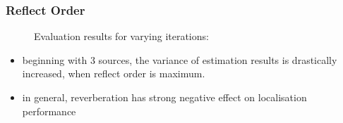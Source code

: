 \subsubsection{Reflect Order}
\begin{figure}[H]
	\begin{tikzpicture}
	    
	    
	\end{tikzpicture}
	\caption[Evaluation results for varying  iterations]{Evaluation results for varying  iterations: }
	\label{fig:trial1}
\end{figure}

\begin{itemize}
    \item beginning with 3 sources, the variance of estimation results is drastically increased, when reflect order is maximum.
    \item in general, reverberation has strong negative effect on localisation performance
\end{itemize}